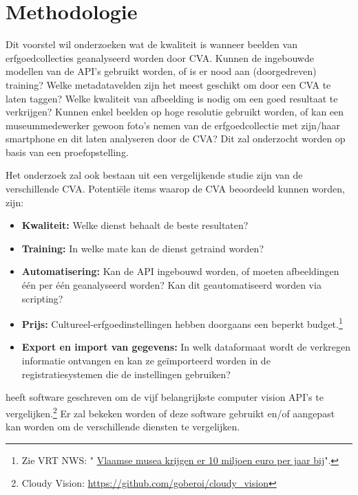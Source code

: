 \documentclass[fleqn,10pt]{voorstel}
\begin{document}
\section{Methodologie}
\label{sec:methodologie}

Dit voorstel wil onderzoeken wat de kwaliteit is wanneer beelden van erfgoedcollecties geanalyseerd worden door CVA. Kunnen de ingebouwde modellen van de API's gebruikt worden, of is er nood aan (doorgedreven) training? Welke metadatavelden zijn het meest geschikt om door een CVA te laten taggen? Welke kwaliteit van afbeelding is nodig om een goed resultaat te verkrijgen? Kunnen enkel beelden op hoge resolutie gebruikt worden, of kan een museummedewerker gewoon foto's nemen van de erfgoedcollectie met zijn/haar smartphone en dit laten analyseren door de CVA? Dit zal onderzocht worden op basis van een proefopstelling.

Het onderzoek zal ook bestaan uit een vergelijkende studie zijn van de verschillende CVA. Potenti\"ele items waarop de CVA beoordeeld kunnen worden, zijn:
\begin{itemize}
	\item \textbf{Kwaliteit:} Welke dienst behaalt de beste resultaten?
	\item \textbf{Training:} In welke mate kan de dienst getraind worden?
	\item \textbf{Automatisering:} Kan de API ingebouwd worden, of moeten afbeeldingen \'{e}\'{e}n per \'{e}\'{e}n geanalyseerd worden? Kan dit geautomatiseerd worden via scripting?
	\item \textbf{Prijs:} Cultureel-erfgoedinstellingen hebben doorgaans een beperkt budget.\footnote{Zie VRT NWS: " \href{https://www.vrt.be/vrtnws/nl/2018/09/28/vlaamse-musea-krijgen-er-10-miljoen-euro-per-jaar-bij/}{Vlaamse musea krijgen er 10 miljoen euro per jaar bij}".}
	\item \textbf{Export en import van gegevens:} In welk dataformaat wordt de verkregen informatie ontvangen en kan ze geïmporteerd worden in de registratiesystemen die de instellingen gebruiken?
\end{itemize}
\textcite{Oberoi2016} heeft software geschreven om de vijf belangrijkste computer vision API's te vergelijken.\footnote{Cloudy Vision: \url{https://github.com/goberoi/cloudy_vision}} Er zal bekeken worden of deze software gebruikt en/of aangepast kan worden om de verschillende diensten te vergelijken.
\end{document}
